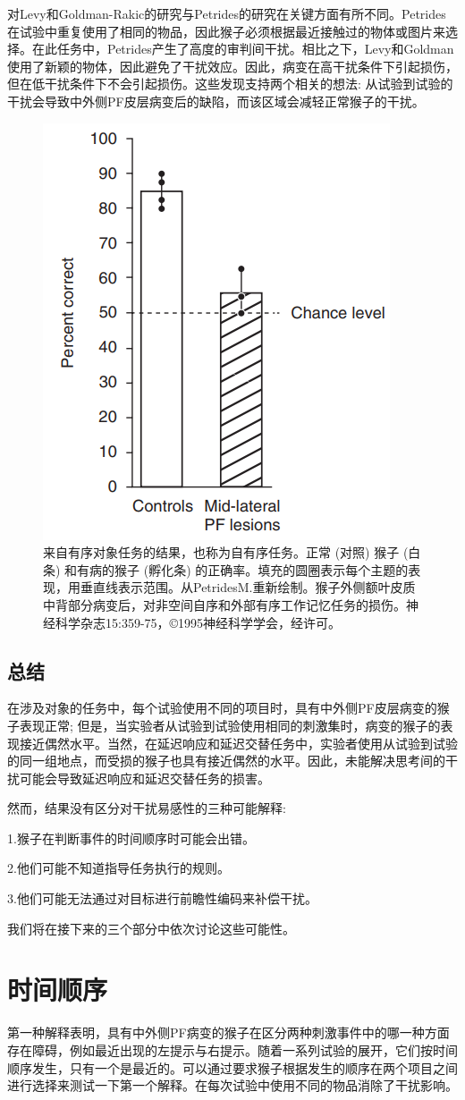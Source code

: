 对Levy和Goldman-Rakic的研究与Petrides的研究在关键方面有所不同。Petrides在试验中重复使用了相同的物品，因此猴子必须根据最近接触过的物体或图片来选择。在此任务中，Petrides产生了高度的审判间干扰。相比之下，Levy和Goldman使用了新颖的物体，因此避免了干扰效应。因此，病变在高干扰条件下引起损伤，但在低干扰条件下不会引起损伤。这些发现支持两个相关的想法: 从试验到试验的干扰会导致中外侧PF皮层病变后的缺陷，而该区域会减轻正常猴子的干扰。
\begin{figure}
	\centering
	\includegraphics[width=0.3\linewidth]{image_pfc/Fig_6_4}
	\caption{来自有序对象任务的结果，也称为自有序任务。正常 (对照) 猴子 (白条) 和有病的猴子 (孵化条) 的正确率。填充的圆圈表示每个主题的表现，用垂直线表示范围。从PetridesM.重新绘制。猴子外侧额叶皮质中背部分病变后，对非空间自序和外部有序工作记忆任务的损伤。神经科学杂志15:359-75，©1995神经科学学会，经许可。}
	\label{fig:fig}
\end{figure}
\subsection{总结}
在涉及对象的任务中，每个试验使用不同的项目时，具有中外侧PF皮层病变的猴子表现正常; 但是，当实验者从试验到试验使用相同的刺激集时，病变的猴子的表现接近偶然水平。当然，在延迟响应和延迟交替任务中，实验者使用从试验到试验的同一组地点，而受损的猴子也具有接近偶然的水平。因此，未能解决思考间的干扰可能会导致延迟响应和延迟交替任务的损害。

然而，结果没有区分对干扰易感性的三种可能解释:
\par
1.猴子在判断事件的时间顺序时可能会出错。
\par
2.他们可能不知道指导任务执行的规则。
\par
3.他们可能无法通过对目标进行前瞻性编码来补偿干扰。

我们将在接下来的三个部分中依次讨论这些可能性。

\section{时间顺序}
第一种解释表明，具有中外侧PF病变的猴子在区分两种刺激事件中的哪一种方面存在障碍，例如最近出现的左提示与右提示。随着一系列试验的展开，它们按时间顺序发生，只有一个是最近的。可以通过要求猴子根据发生的顺序在两个项目之间进行选择来测试一下第一个解释。在每次试验中使用不同的物品消除了干扰影响。

